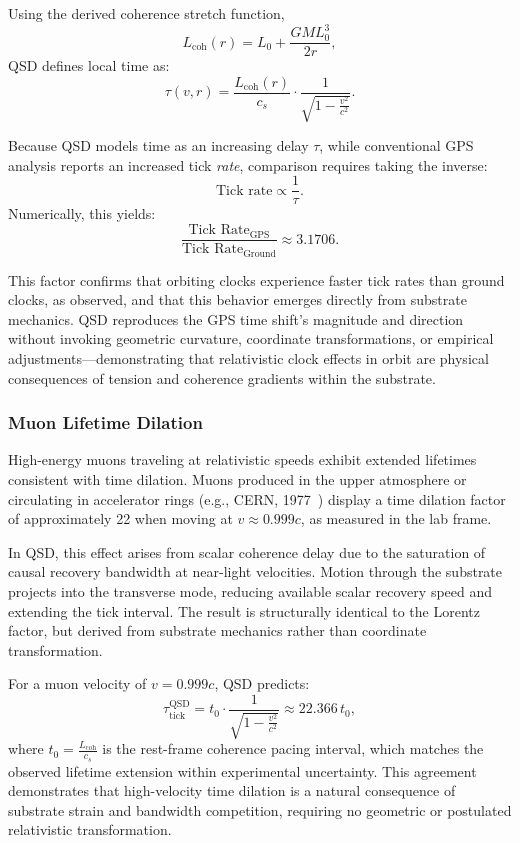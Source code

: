 \documentclass[entropy,article,submit,pdftex,moreauthors]{Definitions/mdpi}
\begin{document}
Using the derived coherence stretch function,
\[
L_{\text{coh}}(r) = L_0 + \frac{GM L_0^3}{2r},
\]
QSD defines local time as:
\[
\tau(v, r) =
\frac{L_{\text{coh}}(r)}{c_s}
\cdot \frac{1}{\sqrt{1 - \frac{v^2}{c^2}}}.
\]

Because QSD models time as an increasing delay \( \tau \), while conventional GPS analysis reports an increased tick \textit{rate}, comparison requires taking the inverse:
\[
\text{Tick rate} \propto \frac{1}{\tau}.
\]
Numerically, this yields:
\[
\frac{\text{Tick Rate}_{\text{GPS}}}{\text{Tick Rate}_{\text{Ground}}} \approx 3.1706.
\]

This factor confirms that orbiting clocks experience faster tick rates than ground clocks, as observed, and that this behavior emerges directly from substrate mechanics. QSD reproduces the GPS time shift's magnitude and direction without invoking geometric curvature, coordinate transformations, or empirical adjustments—demonstrating that relativistic clock effects in orbit are physical consequences of tension and coherence gradients within the substrate.

\subsubsection{Muon Lifetime Dilation}
\label{appendix:muon}

High-energy muons traveling at relativistic speeds exhibit extended lifetimes consistent with time dilation. Muons produced in the upper atmosphere or circulating in accelerator rings (e.g., CERN, 1977~\cite{bailey-muon}) display a time dilation factor of approximately 22 when moving at \( v \approx 0.999c \), as measured in the lab frame.

In QSD, this effect arises from scalar coherence delay due to the saturation of causal recovery bandwidth at near-light velocities. Motion through the substrate projects into the transverse mode, reducing available scalar recovery speed and extending the tick interval. The result is structurally identical to the Lorentz factor, but derived from substrate mechanics rather than coordinate transformation.

For a muon velocity of \( v = 0.999c \), QSD predicts:
\[
\tau_{\text{tick}}^{\text{QSD}} = t_0 \cdot \frac{1}{\sqrt{1 - \frac{v^2}{c^2}}} \approx 22.366 \, t_0,
\]
where \( t_0 = \frac{L_{\text{coh}}}{c_s} \) is the rest-frame coherence pacing interval, which matches the observed lifetime extension within experimental uncertainty. This agreement demonstrates that high-velocity time dilation is a natural consequence of substrate strain and bandwidth competition, requiring no geometric or postulated relativistic transformation.
\end{document}
